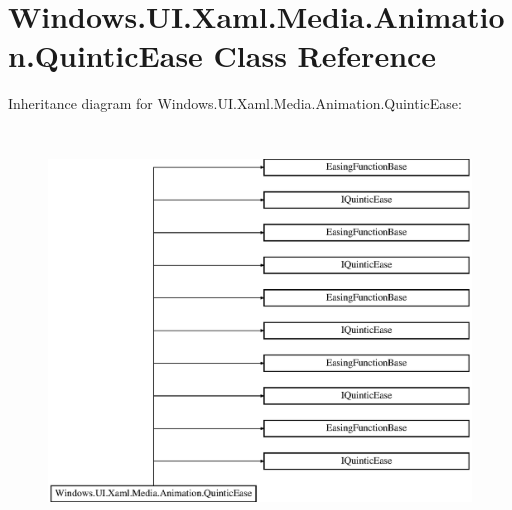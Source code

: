 \hypertarget{class_windows_1_1_u_i_1_1_xaml_1_1_media_1_1_animation_1_1_quintic_ease}{}\section{Windows.\+U\+I.\+Xaml.\+Media.\+Animation.\+Quintic\+Ease Class Reference}
\label{class_windows_1_1_u_i_1_1_xaml_1_1_media_1_1_animation_1_1_quintic_ease}
Inheritance diagram for Windows.\+U\+I.\+Xaml.\+Media.\+Animation.\+Quintic\+Ease\+:\begin{figure}[H]
\begin{center}
\leavevmode
\includegraphics[height=10.731707cm]{class_windows_1_1_u_i_1_1_xaml_1_1_media_1_1_animation_1_1_quintic_ease}
\end{center}
\end{figure}
